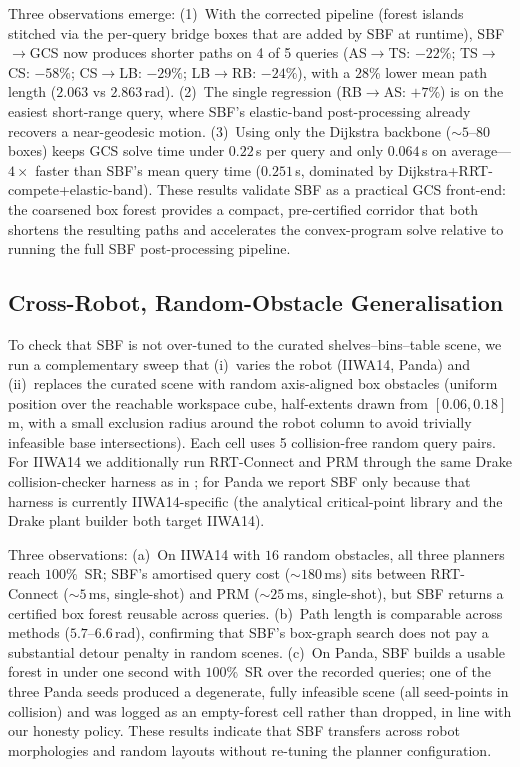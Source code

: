 \documentclass[journal]{IEEEtran}
\begin{document}
Three observations emerge:
(1)~With the corrected pipeline (forest islands stitched via
the per-query bridge boxes that are added by SBF at runtime),
SBF$\to$GCS now produces shorter paths on 4 of 5 queries
(AS$\to$TS: $-22\%$; TS$\to$CS: $-58\%$; CS$\to$LB: $-29\%$;
LB$\to$RB: $-24\%$), with a $28\%$ lower mean path length
($2.063$ vs $2.863$\,rad).
(2)~The single regression (RB$\to$AS: $+7\%$) is on the easiest
short-range query, where SBF's elastic-band post-processing already
recovers a near-geodesic motion.
(3)~Using only the Dijkstra backbone (${\sim}5$--80 boxes)
keeps GCS solve time under $0.22$\,s per query and only $0.064$\,s
on average---$4\times$ faster than SBF's mean query time
($0.251$\,s, dominated by Dijkstra+RRT-compete+elastic-band).
These results validate SBF as a practical GCS front-end:
the coarsened box forest provides a compact, pre-certified corridor
that both shortens the resulting paths and accelerates the
convex-program solve relative to running the full SBF post-processing
pipeline.

\subsection{Cross-Robot, Random-Obstacle Generalisation}\label{sec:exp_randscenes}

To check that SBF is not over-tuned to the curated
shelves--bins--table scene, we run a complementary sweep that
(i)~varies the robot (IIWA14, Panda) and
(ii)~replaces the curated scene with random axis-aligned box
obstacles (uniform position over the reachable workspace cube,
half-extents drawn from $[0.06,0.18]$\,m, with a small exclusion
radius around the robot column to avoid trivially infeasible base
intersections). Each cell uses 5 collision-free random query pairs.
For IIWA14 we additionally run RRT-Connect and PRM through the same
Drake collision-checker harness as in ;
for Panda we report SBF only because that harness is currently
IIWA14-specific (the analytical critical-point library and the
Drake plant builder both target IIWA14).



Three observations:
(a)~On IIWA14 with $16$ random obstacles, all three planners reach
$100\%$~SR; SBF's amortised query cost ($\sim\!180$\,ms) sits between
RRT-Connect ($\sim\!5$\,ms, single-shot) and PRM
($\sim\!25$\,ms, single-shot), but SBF returns a certified box
forest reusable across queries.
(b)~Path length is comparable across methods
($5.7$--$6.6$\,rad), confirming that SBF's box-graph search does
not pay a substantial detour penalty in random scenes.
(c)~On Panda, SBF builds a usable forest in under one second
with $100\%$~SR over the recorded queries; one of the three Panda
seeds produced a degenerate, fully infeasible scene (all
seed-points in collision) and was logged as an empty-forest cell
rather than dropped, in line with our honesty policy. These
results indicate that SBF transfers across robot morphologies and
random layouts without re-tuning the planner configuration.
\end{document}
